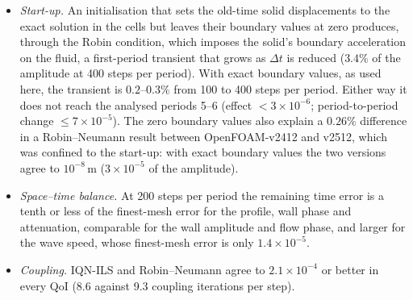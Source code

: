 \begin{itemize}
boundary) and did not converge robustly. (At such fine fixed-mesh time steps, the default flux-ratio coefficient of OpenFOAM's Rhie--Chow \texttt{ddtCorr} term also limits convergence, at $\approx10^{-6}$.)
	\item \emph{Start-up.} An initialisation that sets the old-time solid displacements to the exact solution in the cells but leaves their boundary values at zero produces, through the Robin condition, which imposes the solid's boundary acceleration on the fluid, a first-period transient that grows as $\Delta t$ is reduced ($3.4\%$ of the amplitude at 400 steps per period). With exact boundary values, as used here, the transient is $0.2$--$0.3\%$ from 100 to 400 steps per period. Either way it does not reach the analysed periods 5--6 (effect $<3\times10^{-6}$; period-to-period change $\leq7\times10^{-5}$). The zero boundary values also explain a $0.26\%$ difference in a Robin--Neumann result between OpenFOAM-v2412 and v2512, which was confined to the start-up: with exact boundary values the two versions agree to $10^{-8}\,\mathrm{m}$ ($3\times10^{-5}$ of the amplitude).
	\item \emph{Space--time balance.} At 200 steps per period the remaining time error is a tenth or less of the finest-mesh error for the profile, wall phase and attenuation, comparable for the wall amplitude and flow phase, and larger for the wave speed, whose finest-mesh error is only $1.4\times10^{-5}$.
	\item \emph{Coupling.} IQN-ILS and Robin--Neumann agree to $2.1\times10^{-4}$ or better in every QoI (8.6 against 9.3 coupling iterations per step).
\end{itemize}



